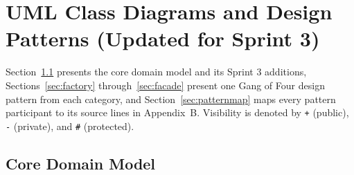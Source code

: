 \documentclass[12pt,letterpaper]{article}
\begin{document}
\section{UML Class Diagrams and Design Patterns (Updated for Sprint 3)}
Section~\ref{sec:domain} presents the core domain model and its Sprint 3 additions,
Sections~\ref{sec:factory} through~\ref{sec:facade} present one Gang of Four design
pattern from each category, and Section~\ref{sec:patternmap} maps every pattern
participant to its source lines in Appendix~B. Visibility is denoted by \texttt{+} (public), \texttt{-}
(private), and \texttt{\#} (protected).

\subsection{Core Domain Model}\label{sec:domain}
\end{document}
